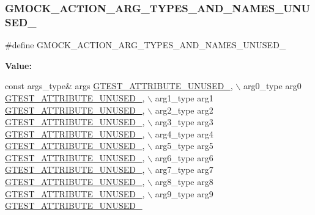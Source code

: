 \subsubsection{\texorpdfstring{G\+M\+O\+C\+K\+\_\+\+A\+C\+T\+I\+O\+N\+\_\+\+A\+R\+G\+\_\+\+T\+Y\+P\+E\+S\+\_\+\+A\+N\+D\+\_\+\+N\+A\+M\+E\+S\+\_\+\+U\+N\+U\+S\+E\+D\+\_\+}{GMOCK\_ACTION\_ARG\_TYPES\_AND\_NAMES\_UNUSED\_}}
{\footnotesize\ttfamily \#define G\+M\+O\+C\+K\+\_\+\+A\+C\+T\+I\+O\+N\+\_\+\+A\+R\+G\+\_\+\+T\+Y\+P\+E\+S\+\_\+\+A\+N\+D\+\_\+\+N\+A\+M\+E\+S\+\_\+\+U\+N\+U\+S\+E\+D\+\_\+}

{\bfseries Value\+:}
\begin{DoxyCode}
\textcolor{keyword}{const} args\_type& args \hyperlink{gtest-port_8h_a01f3b31960fc7c4c7ee4b398a914f89a}{GTEST\_ATTRIBUTE\_UNUSED\_}, \(\backslash\)
    arg0\_type arg0 \hyperlink{gtest-port_8h_a01f3b31960fc7c4c7ee4b398a914f89a}{GTEST\_ATTRIBUTE\_UNUSED\_}, \(\backslash\)
    arg1\_type arg1 \hyperlink{gtest-port_8h_a01f3b31960fc7c4c7ee4b398a914f89a}{GTEST\_ATTRIBUTE\_UNUSED\_}, \(\backslash\)
    arg2\_type arg2 \hyperlink{gtest-port_8h_a01f3b31960fc7c4c7ee4b398a914f89a}{GTEST\_ATTRIBUTE\_UNUSED\_}, \(\backslash\)
    arg3\_type arg3 \hyperlink{gtest-port_8h_a01f3b31960fc7c4c7ee4b398a914f89a}{GTEST\_ATTRIBUTE\_UNUSED\_}, \(\backslash\)
    arg4\_type arg4 \hyperlink{gtest-port_8h_a01f3b31960fc7c4c7ee4b398a914f89a}{GTEST\_ATTRIBUTE\_UNUSED\_}, \(\backslash\)
    arg5\_type arg5 \hyperlink{gtest-port_8h_a01f3b31960fc7c4c7ee4b398a914f89a}{GTEST\_ATTRIBUTE\_UNUSED\_}, \(\backslash\)
    arg6\_type arg6 \hyperlink{gtest-port_8h_a01f3b31960fc7c4c7ee4b398a914f89a}{GTEST\_ATTRIBUTE\_UNUSED\_}, \(\backslash\)
    arg7\_type arg7 \hyperlink{gtest-port_8h_a01f3b31960fc7c4c7ee4b398a914f89a}{GTEST\_ATTRIBUTE\_UNUSED\_}, \(\backslash\)
    arg8\_type arg8 \hyperlink{gtest-port_8h_a01f3b31960fc7c4c7ee4b398a914f89a}{GTEST\_ATTRIBUTE\_UNUSED\_}, \(\backslash\)
    arg9\_type arg9 \hyperlink{gtest-port_8h_a01f3b31960fc7c4c7ee4b398a914f89a}{GTEST\_ATTRIBUTE\_UNUSED\_}
\end{DoxyCode}
\mbox{\label{gmock-generated-actions_8h_af1442d2b3f80b5d04b409bca938fdcc5}} 
